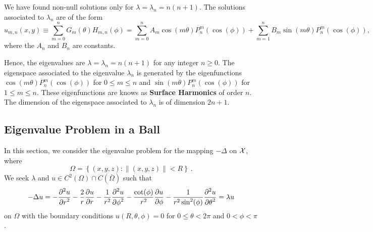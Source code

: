 We have found non-null solutions only for
$\displaystyle \lambda = \lambda_n = n(n+1)$.  The solutions
associated to $\lambda_n$ are of the form
\[
u_{m,n}(x,y) \equiv \sum_{m=0}^n G_m(\theta)H_{m,n}(\phi)
= \sum_{m=0}^n A_m\cos(m\theta) P_n^m(\cos(\phi))
+ \sum_{m=1}^n B_m\sin(m\theta) P_n^m(\cos(\phi))  ,
\]
where the $A_n$ and $B_n$ are constants.

Hence, the eigenvalues are
$\lambda = \lambda_n = n(n+1)$ for any integer $n\geq 0$.
The eigenspace associated to the eigenvalue $\lambda_n$ is
generated by the eigenfunctions
$\displaystyle \cos(m\theta)P_n^m(\cos(\phi))$ for $0 \leq m \leq n$
and
$\displaystyle \sin(m\theta)P_n^m(\cos(\phi))$ for $1 \leq m \leq n$.
These eigenfunctions are knows as
{\bfseries Surface Harmonics} of
order $n$.  The dimension of the eigenspace associated to $\lambda_n$
is of dimension $2n+1$.

\subsection{Eigenvalue Problem in a Ball}

In this section, we consider the eigenvalue problem for the mapping
$-\Delta$ on $\cal X$, where
\[
  \Omega = \left\{ (x,y,z) :  \|(x,y,z)\| < R \right\} \ .
\]
We seek $\lambda$ and
$u \in C^2(\Omega)\cap C(\overline{\Omega})$ such that
\begin{equation} \label{laplace_e_eigenB}
-\Delta u = -\frac{\displaystyle \partial^{2}{u}} {\displaystyle \partial r^{2}} - \frac{2}{r} \frac{\partial{u}}{\partial r}
- \frac{1}{r^2} \frac{\displaystyle \partial^{2}{u}} {\displaystyle \partial \phi^{2}} - \frac{\cot(\phi)}{r^2}
\frac{\partial{u}}{\partial \phi} - \frac{1}{r^2\sin^2(\phi)}\frac{\displaystyle \partial^{2}{u}} {\displaystyle \partial \theta^{2}} 
= \lambda u
\end{equation}
on $\Omega$ with the boundary conditions $u(R,\theta, \phi) =0$ for
$0\leq \theta < 2\pi$ and $0<\phi<\pi$.


